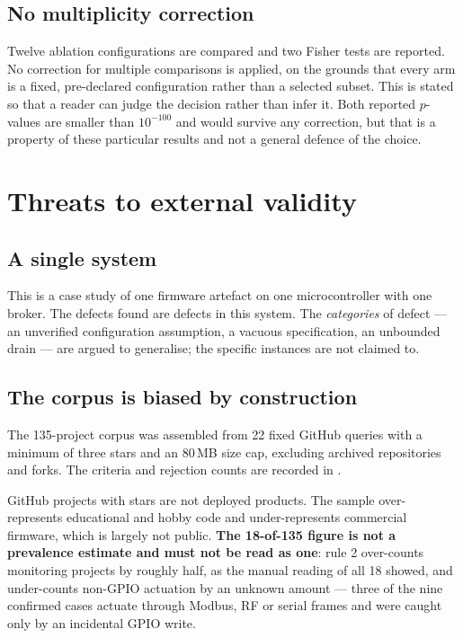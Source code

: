 \subsection{No multiplicity correction}

Twelve ablation configurations are compared and two Fisher tests are reported. No correction for
multiple comparisons is applied, on the grounds that every arm is a fixed, pre-declared
configuration rather than a selected subset. This is stated so that a reader can judge the
decision rather than infer it. Both reported $p$-values are smaller than
$10^{-100}$ and would survive any correction, but that is a property of these particular results
and not a general defence of the choice.

\section{Threats to external validity}

\subsection{A single system}

This is a case study of one firmware artefact on one microcontroller with one broker. The defects
found are defects in this system. The \emph{categories} of defect --- an unverified configuration
assumption, a vacuous specification, an unbounded drain --- are argued to generalise; the specific
instances are not claimed to.

\subsection{The corpus is biased by construction}

The 135-project corpus was assembled from 22 fixed GitHub queries with a minimum of three stars
and an 80\,MB size cap, excluding archived repositories and forks. The criteria and rejection
counts are recorded in .

GitHub projects with stars are not deployed products. The sample over-represents educational and
hobby code and under-represents commercial firmware, which is largely not public. \textbf{The
18-of-135 figure is not a prevalence estimate and must not be read as one}: rule 2
over-counts monitoring projects by roughly half, as the manual reading of all 18 showed, and
under-counts non-GPIO actuation by an unknown amount --- three of the nine confirmed cases actuate
through Modbus, RF or serial frames and were caught only by an incidental GPIO write.

